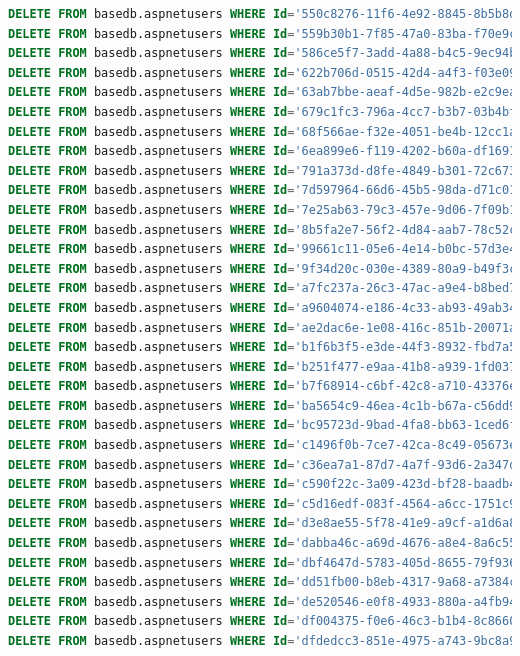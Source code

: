 \documentclass[12pt]{article}
\begin{document}
\begin{lstlisting}[language=SQL, breaklines=true]
DELETE FROM basedb.aspnetusers WHERE Id='550c8276-11f6-4e92-8845-8b5b8d8f0008';
DELETE FROM basedb.aspnetusers WHERE Id='559b30b1-7f85-47a0-83ba-f70e9c3d35aa';
DELETE FROM basedb.aspnetusers WHERE Id='586ce5f7-3add-4a88-b4c5-9ec94bd79d70';
DELETE FROM basedb.aspnetusers WHERE Id='622b706d-0515-42d4-a4f3-f03e0990daca';
DELETE FROM basedb.aspnetusers WHERE Id='63ab7bbe-aeaf-4d5e-982b-e2c9ea73938d';
DELETE FROM basedb.aspnetusers WHERE Id='679c1fc3-796a-4cc7-b3b7-03b4bf0e9d13';
DELETE FROM basedb.aspnetusers WHERE Id='68f566ae-f32e-4051-be4b-12cc1a23ec01';
DELETE FROM basedb.aspnetusers WHERE Id='6ea899e6-f119-4202-b60a-df1691472fa4';
DELETE FROM basedb.aspnetusers WHERE Id='791a373d-d8fe-4849-b301-72c67383ed58';
DELETE FROM basedb.aspnetusers WHERE Id='7d597964-66d6-45b5-98da-d71c01b12f67';
DELETE FROM basedb.aspnetusers WHERE Id='7e25ab63-79c3-457e-9d06-7f09b164f132';
DELETE FROM basedb.aspnetusers WHERE Id='8b5fa2e7-56f2-4d84-aab7-78c52ca4c1db';
DELETE FROM basedb.aspnetusers WHERE Id='99661c11-05e6-4e14-b0bc-57d3e458ebcb';
DELETE FROM basedb.aspnetusers WHERE Id='9f34d20c-030e-4389-80a9-b49f3c43143b';
DELETE FROM basedb.aspnetusers WHERE Id='a7fc237a-26c3-47ac-a9e4-b8bed7fd3824';
DELETE FROM basedb.aspnetusers WHERE Id='a9604074-e186-4c33-ab93-49ab34e39ce1';
DELETE FROM basedb.aspnetusers WHERE Id='ae2dac6e-1e08-416c-851b-20071a792672';
DELETE FROM basedb.aspnetusers WHERE Id='b1f6b3f5-e3de-44f3-8932-fbd7a53f6b3c';
DELETE FROM basedb.aspnetusers WHERE Id='b251f477-e9aa-41b8-a939-1fd0374dc310';
DELETE FROM basedb.aspnetusers WHERE Id='b7f68914-c6bf-42c8-a710-43376e8a8586';
DELETE FROM basedb.aspnetusers WHERE Id='ba5654c9-46ea-4c1b-b67a-c56dd9bcca5c';
DELETE FROM basedb.aspnetusers WHERE Id='bc95723d-9bad-4fa8-bb63-1ced6ffc5c80';
DELETE FROM basedb.aspnetusers WHERE Id='c1496f0b-7ce7-42ca-8c49-05673eceee83';
DELETE FROM basedb.aspnetusers WHERE Id='c36ea7a1-87d7-4a7f-93d6-2a347de37b5d';
DELETE FROM basedb.aspnetusers WHERE Id='c590f22c-3a09-423d-bf28-baadb449a369';
DELETE FROM basedb.aspnetusers WHERE Id='c5d16edf-083f-4564-a6cc-1751c98ecc3b';
DELETE FROM basedb.aspnetusers WHERE Id='d3e8ae55-5f78-41e9-a9cf-a1d6a8c2ec59';
DELETE FROM basedb.aspnetusers WHERE Id='dabba46c-a69d-4676-a8e4-8a6c5598ab76';
DELETE FROM basedb.aspnetusers WHERE Id='dbf4647d-5783-405d-8655-79f9369c4c8e';
DELETE FROM basedb.aspnetusers WHERE Id='dd51fb00-b8eb-4317-9a68-a7384caa3d3b';
DELETE FROM basedb.aspnetusers WHERE Id='de520546-e0f8-4933-880a-a4fb947a3684';
DELETE FROM basedb.aspnetusers WHERE Id='df004375-f0e6-46c3-b1b4-8c8660705c75';
DELETE FROM basedb.aspnetusers WHERE Id='dfdedcc3-851e-4975-a743-9bc8a91078ef';

\end{lstlisting}
\end{document}

